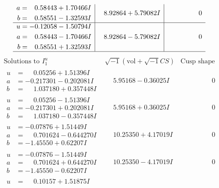 \documentclass[1p]{elsarticle_modified}
\theoremstyle{definition}
\newcommand{\I}{\sqrt{-1}}
\begin{document}
$$\begin{array}{c|c|c}
\begin{aligned}
a &= \phantom{-}0.58443 + 1.70466 I \\
b &= \phantom{-}0.58551 - 1.32593 I\end{aligned}
 & \phantom{-}8.92864 + 5.79082 I & \phantom{-0.000000 } 0 \\ \hline\begin{aligned}
u &= -0.12058 - 1.50794 I \\
a &= \phantom{-}0.58443 - 1.70466 I \\
b &= \phantom{-}0.58551 + 1.32593 I\end{aligned}
 & \phantom{-}8.92864 - 5.79082 I & \phantom{-0.000000 } 0\\
 \hline 
 \end{array}$$\newpage$$\begin{array}{c|c|c}  
\text{Solutions to }I^u_{1}& \I (\text{vol} + \sqrt{-1}CS) & \text{Cusp shape}\\
 \hline 
\begin{aligned}
u &= \phantom{-}0.05256 + 1.51396 I \\
a &= -0.217301 - 0.202081 I \\
b &= \phantom{-}1.037180 + 0.357448 I\end{aligned}
 & \phantom{-}5.95168 - 0.36025 I & \phantom{-0.000000 } 0 \\ \hline\begin{aligned}
u &= \phantom{-}0.05256 - 1.51396 I \\
a &= -0.217301 + 0.202081 I \\
b &= \phantom{-}1.037180 - 0.357448 I\end{aligned}
 & \phantom{-}5.95168 + 0.36025 I & \phantom{-0.000000 } 0 \\ \hline\begin{aligned}
u &= -0.07876 + 1.51449 I \\
a &= \phantom{-}0.701624 - 0.644270 I \\
b &= -1.45550 + 0.62207 I\end{aligned}
 & \phantom{-}10.25350 + 4.17019 I & \phantom{-0.000000 } 0 \\ \hline\begin{aligned}
u &= -0.07876 - 1.51449 I \\
a &= \phantom{-}0.701624 + 0.644270 I \\
b &= -1.45550 - 0.62207 I\end{aligned}
 & \phantom{-}10.25350 - 4.17019 I & \phantom{-0.000000 } 0 \\ \hline\begin{aligned}
u &= \phantom{-}0.10157 + 1.51875 I \\

\end{aligned}
\end{array}$$
\end{document}
